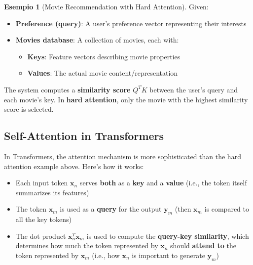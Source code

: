 \documentclass[11pt,a4paper]{article}
\theoremstyle{definition}
\newtheorem{example}{Esempio}[section]
\theoremstyle{plain}
\theoremstyle{remark}
\begin{document}
\begin{example}[Movie Recommendation with Hard Attention]
Given:
\begin{itemize}
    \item \textbf{Preference (query)}: A user's preference vector representing their interests
    \item \textbf{Movies database}: A collection of movies, each with:
    \begin{itemize}
        \item \textbf{Keys}: Feature vectors describing movie properties
        \item \textbf{Values}: The actual movie content/representation
    \end{itemize}
\end{itemize}

The system computes a \textbf{similarity score} $Q^TK$ between the user's query and each movie's key. In \textbf{hard attention}, only the movie with the highest similarity score is selected.
\end{example}

\subsection{Self-Attention in Transformers}

In Transformers, the attention mechanism is more sophisticated than the hard attention example above. Here's how it works:

\begin{tcolorbox}[colback=purple!10!white,colframe=purple!75!black,title=\textbf{Self-Attention: Key Concepts}]
\begin{itemize}
    \item Each input token $\mathbf{x}_n$ serves \textbf{both} as a \textbf{key} and a \textbf{value} (i.e., the token itself summarizes its features)
    
    \item The token $\mathbf{x}_m$ is used as a \textbf{query} for the output $\mathbf{y}_m$ (then $\mathbf{x}_m$ is compared to all the key tokens)
    
    \item The dot product $\mathbf{x}_n^T \mathbf{x}_m$ is used to compute the \textbf{query-key similarity}, which determines how much the token represented by $\mathbf{x}_n$ should \textbf{attend to} the token represented by $\mathbf{x}_m$ (i.e., how $\mathbf{x}_n$ is important to generate $\mathbf{y}_m$)
\end{itemize}
\end{tcolorbox}
\end{document}
